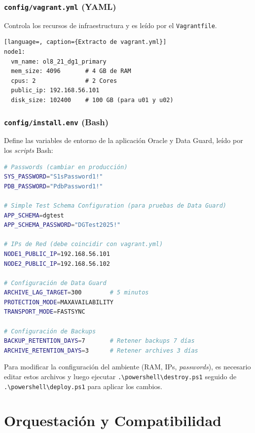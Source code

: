 \documentclass[11pt, a4paper]{report}
\begin{document}
\subsubsection{\texttt{config/vagrant.yml} (YAML)}

Controla los recursos de infraestructura y es leído por el \texttt{Vagrantfile}.
\begin{lstlisting}[language=, caption={Extracto de vagrant.yml}]
node1:
  vm_name: ol8_21_dg1_primary
  mem_size: 4096       # 4 GB de RAM
  cpus: 2              # 2 Cores
  public_ip: 192.168.56.101
  disk_size: 102400    # 100 GB (para u01 y u02)
\end{lstlisting}

\subsubsection{\texttt{config/install.env} (Bash)}

Define las variables de entorno de la aplicación Oracle y Data Guard, leído por los \textit{scripts} Bash:

\begin{lstlisting}[language=bash, caption={Valores de configuración en install.env}]
# Passwords (cambiar en producción)
SYS_PASSWORD="S1sPassword1!"
PDB_PASSWORD="PdbPassword1!"

# Simple Test Schema Configuration (para pruebas de Data Guard)
APP_SCHEMA=dgtest
APP_SCHEMA_PASSWORD="DGTest2025!"

# IPs de Red (debe coincidir con vagrant.yml)
NODE1_PUBLIC_IP=192.168.56.101
NODE2_PUBLIC_IP=192.168.56.102

# Configuración de Data Guard
ARCHIVE_LAG_TARGET=300        # 5 minutos
PROTECTION_MODE=MAXAVAILABILITY
TRANSPORT_MODE=FASTSYNC

# Configuración de Backups
BACKUP_RETENTION_DAYS=7       # Retener backups 7 días
ARCHIVE_RETENTION_DAYS=3      # Retener archives 3 días
\end{lstlisting}

Para modificar la configuración del ambiente (RAM, IPs, \textit{passwords}), es necesario editar estos archivos y luego ejecutar \texttt{.\textbackslash powershell\textbackslash destroy.ps1} seguido de \texttt{.\textbackslash powershell\textbackslash deploy.ps1} para aplicar los cambios.

\section{Orquestación y Compatibilidad}
\end{document}
